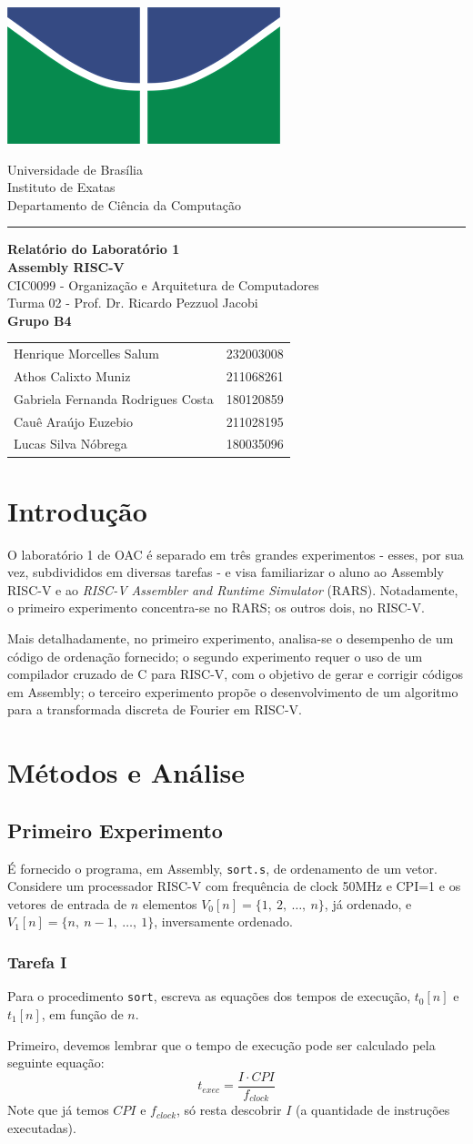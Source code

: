\documentclass[a4paper,12pt]{article}
\newcommand{\cod}[1]{\texttt{#1}}
\newcommand{\capa}{
    \begin{titlepage}
        \begin{multicols}{2}
            \begin{flushleft}
                \includegraphics[width=0.45\linewidth]{Recursos/Imagens/UnB_logo.png}
            \end{flushleft}
            \columnbreak
            \begin{flushright}
                Universidade de Brasília \\
                Instituto de Exatas \\
                Departamento de Ciência da Computação
            \end{flushright}
        \end{multicols}
        \begin{center}
        \vspace{-20pt}
        \rule{\textwidth}{0.4pt}
        \end{center}
        \vspace{0.6cm}
        \begin{center}
            {\Huge \textbf{Relatório do Laboratório 1}} \\[0.5em]
            {\Huge \textbf{Assembly RISC-V}} \\ [0.5em]
            {\large CIC0099 - Organização e Arquitetura de Computadores} \\[0.25em]
            {\large Turma 02 - Prof. Dr. Ricardo Pezzuol Jacobi} \\
            \vfill
            {\Large \textbf{Grupo B4}} \\
            \begin{table}[H]
                \centering
                \begin{tabular}{l r}
                    Henrique Morcelles Salum & 232003008 \\
                    Athos Calixto Muniz & 211068261 \\
                    Gabriela Fernanda Rodrigues Costa & 180120859 \\
                    Cauê Araújo Euzebio & 211028195 \\
                    Lucas Silva Nóbrega & 180035096 \\
                \end{tabular}
                \label{tab:placeholder}
            \end{table}
        \end{center}
    \end{titlepage}
}
\begin{document}
\capa

\newpage
\tableofcontents
\newpage

\section{Introdução}
O laboratório 1 de OAC é separado em três grandes experimentos - esses, por sua vez, subdivididos em diversas tarefas - e visa familiarizar o aluno ao Assembly RISC-V e ao \textit{RISC-V Assembler and Runtime Simulator} (RARS). Notadamente, o primeiro experimento concentra-se no RARS; os outros dois, no RISC-V.

Mais detalhadamente, no primeiro experimento, analisa-se o desempenho de um código de ordenação fornecido; o segundo experimento requer o uso de um compilador cruzado de C para RISC-V, com o objetivo de gerar e corrigir códigos em Assembly; o terceiro experimento propõe o desenvolvimento de um algoritmo para a transformada discreta de Fourier em RISC-V.

\section{Métodos e Análise}

\subsection{Primeiro Experimento}
É fornecido o programa, em Assembly, \cod{sort.s}, de ordenamento de um vetor. Considere um processador RISC-V com frequência de clock 50MHz e CPI=1 e os vetores de entrada de $n$ elementos $V_0\left[n\right] = \{1, \ 2, \ \dots, \ n\}$, já ordenado, e $V_1\left[n\right] = \{n, \ n-1, \ \dots, \ 1 \}$, inversamente ordenado.

\subsubsection{Tarefa I}
\begin{tcolorbox}[title=Enunciado, colback=blue!5!white, colframe=blue!75!black]
Para o procedimento \cod{sort}, escreva as equações dos tempos de execução, $t_0[n]$ e $t_1[n]$, em função de $n$.
\end{tcolorbox}

Primeiro, devemos lembrar que o tempo de execução pode ser calculado pela seguinte equação:
\begin{equation}
    t_{exec} =\frac{I \cdot CPI}{f_{clock}} \label{eq:tempo}
\end{equation}
Note que já temos $CPI$ e $f_{clock}$, só resta descobrir $I$ (a quantidade de instruções executadas).
\end{document}
